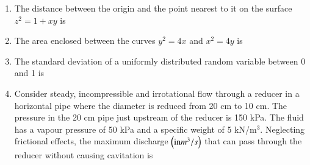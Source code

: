\documentclass[journal]{IEEEtran}
\begin{document}
\begin{enumerate}[leftmargin=0pt]
\item The distance between the origin and the point nearest to it on the surface $z^2 = 1+xy$ is
\begin{enumerate}
\hfill{}
\end{enumerate}

\item The area enclosed between the curves $y^2 = 4x$ and $x^2 = 4y$ is
\begin{enumerate}
\hfill{}
\end{enumerate}

\item The standard deviation of a uniformly distributed random variable between 0 and 1 is
\begin{enumerate}
\hfill{}
\end{enumerate}

\item Consider steady, incompressible and irrotational flow through a reducer in a horizontal pipe where the diameter is reduced from 20 cm to 10 cm. The pressure in the 20 cm pipe just upstream of the reducer is 150 kPa. The fluid has a vapour pressure of 50 kPa and a specific weight of 5 kN/m$^3$. Neglecting frictional effects, the maximum discharge $\left(\text{in} m^3/s\right)$ that can pass through the reducer without causing cavitation is
\begin{enumerate}
\hfill{}
\end{enumerate}


\end{enumerate}
\end{document}
